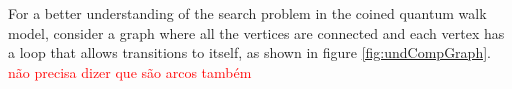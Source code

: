                 For a better understanding of the search problem in the coined quantum walk model, consider a graph where all the vertices are connected and each vertex has a loop that allows transitions to itself, as shown in figure \ref{fig:undCompGraph}. \textcolor{red}{não precisa dizer que são arcos também}
%
%                    
